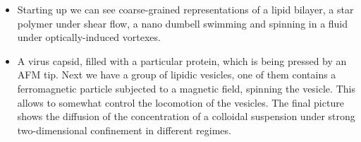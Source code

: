 \documentclass[xcolor=dvipsnames, compress]{beamer}
\begin{document}
\begin{frame}
{\begin{itemize}
    \item Starting up we can see coarse-grained representations of a lipid bilayer, a star polymer under shear flow, a nano dumbell swimming and spinning in a fluid under optically-induced vortexes.
    \item A virus capsid, filled with a particular protein, which is being pressed by an AFM tip. Next we have a group of lipidic vesicles, one of them contains a ferromagnetic particle subjected to a magnetic field, spinning the vesicle. This allows to somewhat control the locomotion of the vesicles. The final picture shows the diffusion of the concentration of a colloidal suspension under strong two-dimensional confinement in different regimes.
    \end{itemize}    
  }  
\end{frame}
\end{document}
